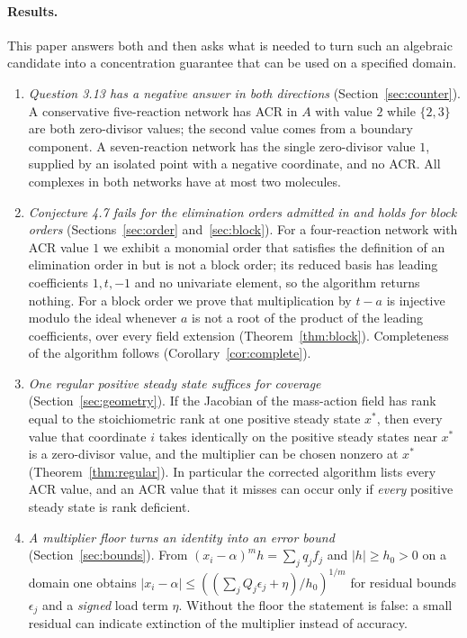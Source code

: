\documentclass[11pt,a4paper]{article}
\theoremstyle{plain}
\theoremstyle{definition}
\theoremstyle{remark}
\begin{document}
\paragraph{Results.}
This paper answers both and then asks what is needed to turn such an algebraic candidate into a concentration guarantee that can be used on a specified domain.
\begin{enumerate}[label=(\arabic*)]
\item \emph{Question 3.13 has a negative answer in both directions} (Section~\ref{sec:counter}). A conservative five-reaction network has ACR in $A$ with value $2$ while $\{2,3\}$ are both zero-divisor values; the second value comes from a boundary component. A seven-reaction network has the single zero-divisor value $1$, supplied by an isolated point with a negative coordinate, and no ACR. All complexes in both networks have at most two molecules.
\item \emph{Conjecture 4.7 fails for the elimination orders admitted in \cite{acr} and holds for block orders} (Sections~\ref{sec:order} and~\ref{sec:block}). For a four-reaction network with ACR value $1$ we exhibit a monomial order that satisfies the definition of an elimination order in \cite{acr} but is not a block order; its reduced basis has leading coefficients $1,t,-1$ and no univariate element, so the algorithm returns nothing. For a block order we prove that multiplication by $t-a$ is injective modulo the ideal whenever $a$ is not a root of the product of the leading coefficients, over every field extension (Theorem~\ref{thm:block}). Completeness of the algorithm follows (Corollary~\ref{cor:complete}).
\item \emph{One regular positive steady state suffices for coverage} (Section~\ref{sec:geometry}). If the Jacobian of the mass-action field has rank equal to the stoichiometric rank at one positive steady state $x^*$, then every value that coordinate $i$ takes identically on the positive steady states near $x^*$ is a zero-divisor value, and the multiplier can be chosen nonzero at $x^*$ (Theorem~\ref{thm:regular}). In particular the corrected algorithm lists every ACR value, and an ACR value that it misses can occur only if \emph{every} positive steady state is rank deficient.
\item \emph{A multiplier floor turns an identity into an error bound} (Section~\ref{sec:bounds}). From $(x_i-\alpha)^m h=\sum_j q_jf_j$ and $|h|\ge h_0>0$ on a domain one obtains $|x_i-\alpha|\le((\sum_jQ_j\epsilon_j+\eta)/h_0)^{1/m}$ for residual bounds $\epsilon_j$ and a \emph{signed} load term $\eta$. Without the floor the statement is false: a small residual can indicate extinction of the multiplier instead of accuracy.

\end{enumerate}
\end{document}
